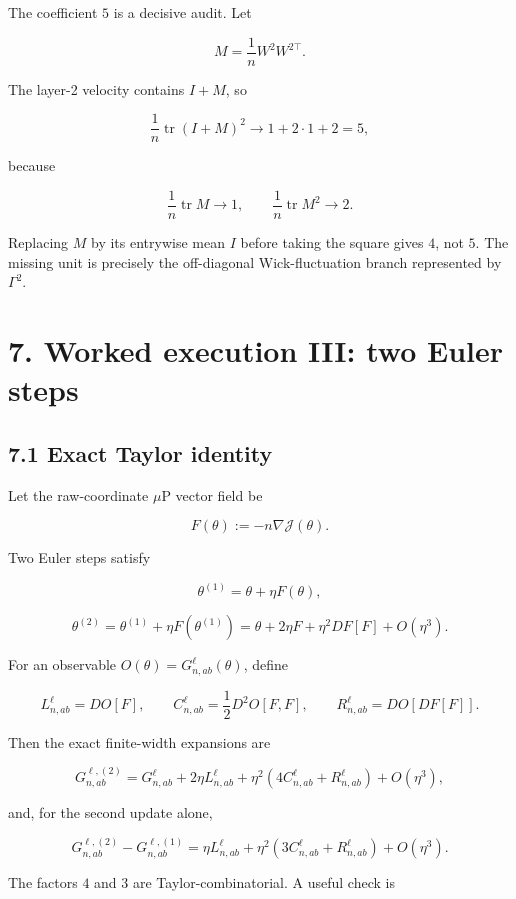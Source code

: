The coefficient \(5\) is a decisive audit. Let

\[
M=\frac1nW^2W^{2\top}.
\]


The layer-2 velocity contains \(I+M\), so

\[
\frac1n\operatorname{tr}(I+M)^2
\longrightarrow
1+2\cdot1+2=5,
\]


because

\[
\frac1n\operatorname{tr}M\to1,
\qquad
\frac1n\operatorname{tr}M^2\to2.
\]


Replacing \(M\) by its entrywise mean \(I\) before taking the square gives
\(4\), not \(5\). The missing unit is precisely the off-diagonal
Wick-fluctuation branch represented by \(\Gamma^2\).

\section*{7. Worked execution III: two Euler steps}


\subsection*{7.1 Exact Taylor identity}


Let the raw-coordinate \(\mu\)P vector field be

\[
F(\theta):=-n\nabla\mathcal J(\theta).
\]


Two Euler steps satisfy

\[
\theta^{(1)}=\theta+\eta F(\theta),
\]


\[
\theta^{(2)}
=
\theta^{(1)}+\eta F(\theta^{(1)})
=
\theta+2\eta F+\eta^2DF[F]+O(\eta^3).
\]


For an observable \(O(\theta)=G^\ell_{n,ab}(\theta)\), define

\[
L^\ell_{n,ab}=DO[F],
\qquad
C^\ell_{n,ab}=\frac12D^2O[F,F],
\qquad
R^\ell_{n,ab}=DO[DF[F]].
\]


Then the exact finite-width expansions are

\[
\boxed{
G^{\ell,(2)}_{n,ab}
=
G^\ell_{n,ab}
+2\eta L^\ell_{n,ab}
+\eta^2(4C^\ell_{n,ab}+R^\ell_{n,ab})
+O(\eta^3),
}
\]


and, for the second update alone,

\[
\boxed{
G^{\ell,(2)}_{n,ab}-G^{\ell,(1)}_{n,ab}
=
\eta L^\ell_{n,ab}
+\eta^2(3C^\ell_{n,ab}+R^\ell_{n,ab})
+O(\eta^3).
}
\]


The factors \(4\) and \(3\) are Taylor-combinatorial. A useful check is

